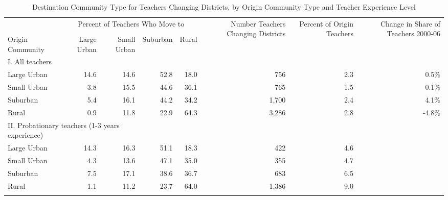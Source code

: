 \documentclass[]{article}
\begin{document}
\begin{longtable}{lrrrrrrr}
  \hline
 & \multicolumn{4}{c}{\multirow{2}{*}{Percent of Teachers Who Move to}} & \multirow{4}{*}{\parbox{0.13\linewidth}{Number Teachers Changing Districts}} & \multirow{4}{*}{\parbox{0.12\linewidth}{Percent of Origin Teachers}} & \multirow{4}{*}{\parbox{0.16\linewidth}{Change in Share of Teachers 2000-06}}\\
 & \multicolumn{4}{c}{} & & & \\ \cline{2-5}
& & & & & & & \\
Origin Community & Large Urban & Small Urban & Suburban & Rural &  &  &  \\ 
  \hline
I. All teachers & & & & & & & \\
\quad Large Urban & 14.6 & 14.6 & 52.8 & 18.0 & 756 & 2.3 & 0.5\% \\ 
  \quad Small Urban & 3.8 & 15.5 & 44.6 & 36.1 & 765 & 1.5 & 0.1\% \\ 
  \quad Suburban & 5.4 & 16.1 & 44.2 & 34.2 & 1,700 & 2.4 & 4.1\% \\ 
  \quad Rural & 0.9 & 11.8 & 22.9 & 64.3 & 3,286 & 2.8 & -4.8\% \\ 
\multicolumn{3}{l}{II. Probationary teachers (1-3 years experience)} & & & & & \\
  \quad Large Urban & 14.3 & 16.3 & 51.1 & 18.3 & 422 & 4.6 &  \\ 
  \quad Small Urban & 4.3 & 13.6 & 47.1 & 35.0 & 355 & 4.7 &  \\ 
  \quad Suburban & 7.5 & 17.1 & 38.6 & 36.7 & 683 & 6.5 &  \\ 
  \quad Rural & 1.1 & 11.2 & 23.7 & 64.0 & 1,386 & 9.0 &  \\ 
   \hline

\caption{Destination Community Type for Teachers Changing Districts, by Origin Community Type and Teacher Experience Level} 
\label{tbl:markov}
\end{longtable}
\end{document}
